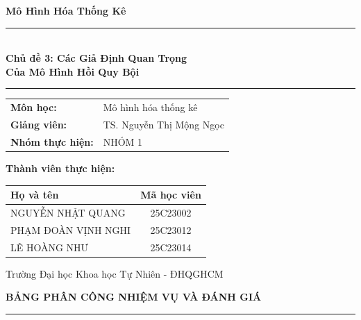 \documentclass[12pt, a4paper]{article}
\begin{document}
	
	\begin{titlepage}
		\centering
		\vspace*{1.5cm}
		
		{\Large\bfseries Mô Hình Hóa Thống Kê}\\[0.5cm]
		{\rule{\linewidth}{1.5pt}}\\[0.3cm]
		
		{\Huge\bfseries
			Chủ đề 3: Các Giả Định Quan Trọng \\[0.3cm]
			Của Mô Hình Hồi Quy Bội}\\[0.3cm]
		{\rule{\linewidth}{1.5pt}}
		
		\vspace{2.5cm}
		
		\centering \large
		\renewcommand{\arraystretch}{1.5}
		\begin{tabular}{ll}
			\textbf{Môn học:} & Mô hình hóa thống kê \\
			\textbf{Giảng viên:} & TS. Nguyễn Thị Mộng Ngọc \\
			\textbf{Nhóm thực hiện:} & NHÓM 1
		\end{tabular}
		
		\vfill
		\textbf{Thành viên thực hiện:} \\[0.4cm]
		\renewcommand{\arraystretch}{1.3}
		\begin{tabular}{l c}
			\toprule
			\textbf{Họ và tên} & \textbf{Mã học viên} \\ 
			\midrule
			NGUYỄN NHẬT QUANG & 25C23002 \\
			PHẠM ĐOÀN VỊNH NGHI & 25C23012 \\
			LÊ HOÀNG NHƯ & 25C23014 \\
			\bottomrule
		\end{tabular}
		
		\vfill
		{\small Trường Đại học Khoa học Tự Nhiên - ĐHQGHCM}
	\end{titlepage}
	
	\newpage
	\begin{center}
		{\Large\bfseries BẢNG PHÂN CÔNG NHIỆM VỤ VÀ ĐÁNH GIÁ}\\[0.3cm]
		{\rule{\linewidth}{1pt}}
	\end{center}
	
	\vspace{0.5cm}
	
\end{document}
